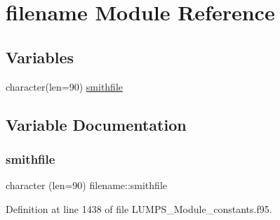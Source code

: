 \hypertarget{namespacefilename}{}\section{filename Module Reference}
\label{namespacefilename}
\subsection*{Variables}
\begin{DoxyCompactItemize}
\item 
character(len=90) \hyperlink{namespacefilename_aa95ca3ddcb260b59335c2c461f1820d0}{smithfile}
\end{DoxyCompactItemize}


\subsection{Variable Documentation}
\mbox{\label{namespacefilename_aa95ca3ddcb260b59335c2c461f1820d0}} 
\subsubsection{\texorpdfstring{smithfile}{smithfile}}
{\footnotesize\ttfamily character (len=90) filename\+::smithfile}



Definition at line 1438 of file L\+U\+M\+P\+S\+\_\+\+Module\+\_\+constants.\+f95.

